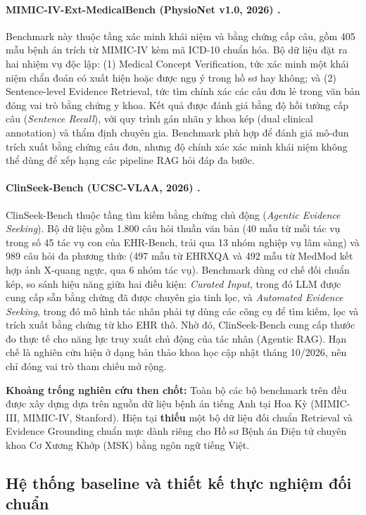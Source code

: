 \paragraph{MIMIC-IV-Ext-MedicalBench (PhysioNet v1.0, 2026) \cite{medicalbench2026}.}
Benchmark này thuộc tầng xác minh khái niệm và bằng chứng cấp câu, gồm 405 mẫu bệnh án trích từ MIMIC-IV kèm mã ICD-10 chuẩn hóa. Bộ dữ liệu đặt ra hai nhiệm vụ độc lập: (1) Medical Concept Verification, tức xác minh một khái niệm chẩn đoán có xuất hiện hoặc được ngụ ý trong hồ sơ hay không; và (2) Sentence-level Evidence Retrieval, tức tìm chính xác các câu đơn lẻ trong văn bản đóng vai trò bằng chứng y khoa. Kết quả được đánh giá bằng độ hồi tưởng cấp câu (\emph{Sentence Recall}), với quy trình gán nhãn y khoa kép (dual clinical annotation) và thẩm định chuyên gia. Benchmark phù hợp để đánh giá mô-đun trích xuất bằng chứng câu đơn, nhưng độ chính xác xác minh khái niệm không thể dùng để xếp hạng các pipeline RAG hỏi đáp đa bước.

\paragraph{ClinSeek-Bench (UCSC-VLAA, 2026) \cite{clinseek2026}.}
ClinSeek-Bench thuộc tầng tìm kiếm bằng chứng chủ động (\emph{Agentic Evidence Seeking}). Bộ dữ liệu gồm 1.800 câu hỏi thuần văn bản (40 mẫu từ mỗi tác vụ trong số 45 tác vụ con của EHR-Bench, trải qua 13 nhóm nghiệp vụ lâm sàng) và 989 câu hỏi đa phương thức (497 mẫu từ EHRXQA và 492 mẫu từ MedMod kết hợp ảnh X-quang ngực, qua 6 nhóm tác vụ). Benchmark dùng cơ chế đối chuẩn kép, so sánh hiệu năng giữa hai điều kiện: \emph{Curated Input}, trong đó LLM được cung cấp sẵn bằng chứng đã được chuyên gia tinh lọc, và \emph{Automated Evidence Seeking}, trong đó mô hình tác nhân phải tự dùng các công cụ để tìm kiếm, lọc và trích xuất bằng chứng từ kho EHR thô. Nhờ đó, ClinSeek-Bench cung cấp thước đo thực tế cho năng lực truy xuất chủ động của tác nhân (Agentic RAG). Hạn chế là nghiên cứu hiện ở dạng bản thảo khoa học cập nhật tháng 10/2026, nên chỉ đóng vai trò tham chiếu mở rộng.

\noindent\textbf{Khoảng trống nghiên cứu then chốt:} Toàn bộ các bộ benchmark trên đều được xây dựng dựa trên nguồn dữ liệu bệnh án tiếng Anh tại Hoa Kỳ (MIMIC-III, MIMIC-IV, Stanford). Hiện tại \textbf{thiếu} một bộ dữ liệu đối chuẩn Retrieval và Evidence Grounding chuẩn mực dành riêng cho Hồ sơ Bệnh án Điện tử chuyên khoa Cơ Xương Khớp (MSK) bằng ngôn ngữ tiếng Việt.

\subsection{Hệ thống baseline và thiết kế thực nghiệm đối chuẩn}

